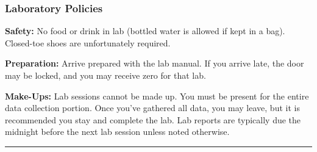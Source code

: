\documentclass[12pt]{article}
\begin{document}
\subsubsection*{Laboratory Policies}
\noindent
\textbf{Safety:} No food or drink in lab (bottled water is allowed if kept in a bag). Closed-toe shoes are unfortunately required.

\noindent
\textbf{Preparation:} Arrive prepared with the lab manual. 
If you arrive late, the door may be locked, and you may receive zero for that lab. 

\noindent
\textbf{Make-Ups:} Lab sessions cannot be made up. 
You must be present for the entire data collection portion. 
Once you've gathered all data, you may leave, but it is recommended you stay and complete the lab. 
Lab reports are typically due the midnight before the next lab session unless noted otherwise.

\medskip
\hrule

\end{document}
